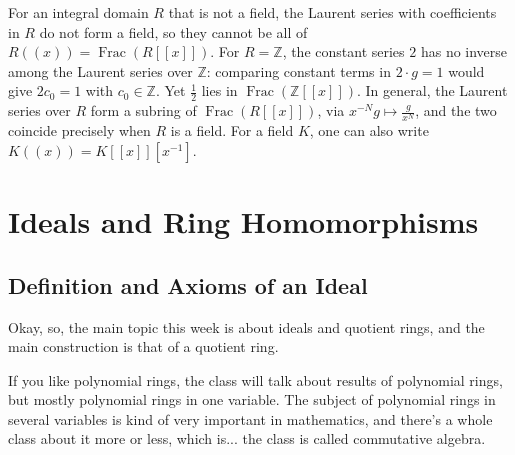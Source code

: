 \begin{aiNote}
For an integral domain $R$ that is not a field, the Laurent series with coefficients in $R$ do not form a field, so they cannot be all of $R((x)) = \operatorname{Frac}(R[[x]])$. For $R = \mathbb{Z}$, the constant series $2$ has no inverse among the Laurent series over $\mathbb{Z}$: comparing constant terms in $2 \cdot g = 1$ would give $2 c_0 = 1$ with $c_0 \in \mathbb{Z}$. Yet $\frac{1}{2}$ lies in $\operatorname{Frac}(\mathbb{Z}[[x]])$. In general, the Laurent series over $R$ form a subring of $\operatorname{Frac}(R[[x]])$, via $x^{-N} g \mapsto \frac{g}{x^N}$, and the two coincide precisely when $R$ is a field. For a field $K$, one can also write $K((x)) = K[[x]][x^{-1}]$.
\end{aiNote}

\begin{hidden}
\end{hidden}

\section{Ideals and Ring Homomorphisms}

\subsection{Definition and Axioms of an Ideal}

\begin{speech}[00:15:33 - 00:16:29]
Okay, so, the main topic this week is about ideals and quotient rings, and the main construction is that of a quotient ring. 

If you like polynomial rings, the class will talk about results of polynomial rings, but mostly polynomial rings in one variable. The subject of polynomial rings in several variables is kind of very important in mathematics, and there's a whole class about it more or less, which is... the class is called commutative algebra.
\end{speech}

